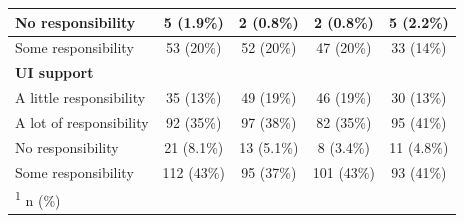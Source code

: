 \documentclass[
  11pt,
  oneside]{article}
\begin{document}
\begin{table}
\begin{tabular}[t]{l|c|c|c|c}
\hline
\hspace{1em}No responsibility & 5 (1.9\%) & 2 (0.8\%) & 2 (0.8\%) & 5 (2.2\%)\\
\hline
\hspace{1em}Some responsibility & 53 (20\%) & 52 (20\%) & 47 (20\%) & 33 (14\%)\\
\hline
\textbf{UI support} &  &  &  & \\
\hline
\hspace{1em}A little responsibility & 35 (13\%) & 49 (19\%) & 46 (19\%) & 30 (13\%)\\
\hline
\hspace{1em}A lot of responsibility & 92 (35\%) & 97 (38\%) & 82 (35\%) & 95 (41\%)\\
\hline
\hspace{1em}No responsibility & 21 (8.1\%) & 13 (5.1\%) & 8 (3.4\%) & 11 (4.8\%)\\
\hline
\hspace{1em}Some responsibility & 112 (43\%) & 95 (37\%) & 101 (43\%) & 93 (41\%)\\
\hline
\multicolumn{5}{l}{\rule{0pt}{1em}\textsuperscript{1} n (\%)}\\
\end{tabular}
\end{table}
\end{document}
